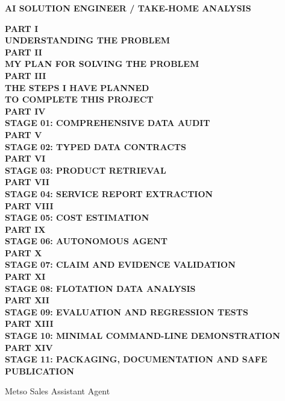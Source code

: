 \documentclass[11pt,a4paper]{article}
\begin{document}
\thispagestyle{empty}
\vspace*{1mm}
{\sffamily\large\color{Blue}\textbf{AI SOLUTION ENGINEER / TAKE-HOME ANALYSIS}}\\[1mm]
{\sffamily\fontsize{8.0}{9.1}\selectfont\bfseries\color{Navy}
PART I\\UNDERSTANDING THE PROBLEM\\[1mm]
PART II\\MY PLAN FOR SOLVING THE PROBLEM\\[1mm]
PART III\\THE STEPS I HAVE PLANNED\\TO COMPLETE THIS PROJECT\\[1mm]
PART IV\\STAGE 01: COMPREHENSIVE DATA AUDIT\\[1mm]
PART V\\STAGE 02: TYPED DATA CONTRACTS\\[1mm]
PART VI\\STAGE 03: PRODUCT RETRIEVAL\\[1mm]
PART VII\\STAGE 04: SERVICE REPORT EXTRACTION\\[1mm]
PART VIII\\STAGE 05: COST ESTIMATION\\[1mm]
PART IX\\STAGE 06: AUTONOMOUS AGENT\\[1mm]
PART X\\STAGE 07: CLAIM AND EVIDENCE VALIDATION\\[1mm]
PART XI\\STAGE 08: FLOTATION DATA ANALYSIS\\[1mm]
PART XII\\STAGE 09: EVALUATION AND REGRESSION TESTS\\[1mm]
PART XIII\\STAGE 10: MINIMAL COMMAND-LINE DEMONSTRATION\\[1mm]
PART XIV\\STAGE 11: PACKAGING, DOCUMENTATION AND SAFE PUBLICATION\par}
\vspace{1mm}
{\sffamily\fontsize{15}{19}\selectfont\color{Gray}Metso Sales Assistant Agent\par}
\vspace{1mm}
\vspace{1mm}
\end{document}

